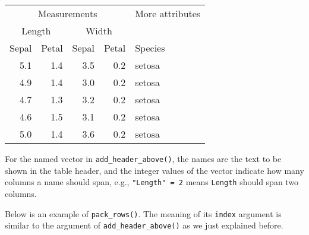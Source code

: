 \documentclass[
  11pt,
]{krantz}
\newenvironment{Shaded}{\begin{snugshade}}{\end{snugshade}}
\newcommand{\DataTypeTok}[1]{\textcolor[rgb]{0.27,0.27,0.27}{#1}}
\newcommand{\DecValTok}[1]{\textcolor[rgb]{0.06,0.06,0.06}{#1}}
\newcommand{\KeywordTok}[1]{\textcolor[rgb]{0.27,0.27,0.27}{\textbf{#1}}}
\newcommand{\NormalTok}[1]{#1}
\newcommand{\OperatorTok}[1]{\textcolor[rgb]{0.43,0.43,0.43}{\textbf{#1}}}
\newcommand{\OtherTok}[1]{\textcolor[rgb]{0.37,0.37,0.37}{#1}}
\newcommand{\StringTok}[1]{\textcolor[rgb]{0.5,0.5,0.5}{#1}}
\begin{document}
\begin{tabular}{rrrrl}
\toprule
\multicolumn{4}{c}{Measurements} & \multicolumn{1}{c}{More attributes} \\
\cmidrule(l{3pt}r{3pt}){1-4} \cmidrule(l{3pt}r{3pt}){5-5}
\multicolumn{2}{c}{Length} & \multicolumn{2}{c}{Width} & \multicolumn{1}{c}{ } \\
\cmidrule(l{3pt}r{3pt}){1-2} \cmidrule(l{3pt}r{3pt}){3-4}
Sepal & Petal & Sepal & Petal & Species\\
\midrule
5.1 & 1.4 & 3.5 & 0.2 & setosa\\
4.9 & 1.4 & 3.0 & 0.2 & setosa\\
4.7 & 1.3 & 3.2 & 0.2 & setosa\\
4.6 & 1.5 & 3.1 & 0.2 & setosa\\
5.0 & 1.4 & 3.6 & 0.2 & setosa\\
\bottomrule
\end{tabular}

For the named vector in \texttt{add\_header\_above()}, the names are the text to be shown in the table header, and the integer values of the vector indicate how many columns a name should span, e.g., \texttt{"Length"\ =\ 2} means \texttt{Length} should span two columns.

Below is an example of \texttt{pack\_rows()}. The meaning of its \texttt{index} argument is similar to the argument of \texttt{add\_header\_above()} as we just explained before.

\begin{Shaded}
\end{Shaded}
\end{document}
